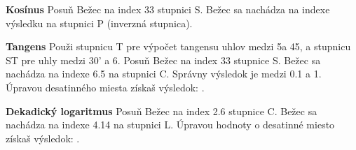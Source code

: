 \begin{multicols*}{3}
{  \textbf{Kosínus}
Posuň Bežec na index 33 stupnici S.
Bežec sa nachádza na indexe výsledku  na stupnici P (inverzná stupnica).

  \textbf{Tangens}
\footnotesize Použi stupnicu T pre výpočet tangensu uhlov medzi 5\textdegree a 45\textdegree, a stupnicu ST pre uhly medzi 30' a 6\textdegree. \normalsize
{}
Posuň Bežec na index 33 stupnice S.
Bežec sa nachádza na indexe 6.5 na stupnici C.
Správny výsledok je medzi 0.1 a 1. Úpravou desatinného miesta získaš výsledok: .

  \textbf{Dekadický logaritmus}
Posuň Bežec na index 2.6 stupnice C.
Bežec sa nachádza na indexe 4.14 na stupnici L.
Úpravou hodnoty o desatinné miesto získaš výsledok: .
  }
  \end{multicols*}
  

